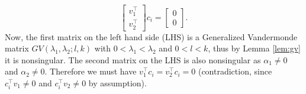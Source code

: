 \documentclass[twocolumn]{autart}    %
\begin{document}
{\begin{pf}
\begin{equation}
	\begin{bmatrix} v_1^\top \\ v_2^\top \end{bmatrix} c_i = \begin{bmatrix} 0 \\ 0 \end{bmatrix}. \nonumber 
\end{equation}
Now, the first matrix on the left hand side (LHS) is a Generalized Vandermonde matrix $GV(\lambda_1,\lambda_2;l, k)$ with $0<\lambda_1< \lambda_2$ and $0< l<k$, thus by Lemma \ref{lem:gv} it is nonsingular. The second matrix on the LHS is also nonsingular as $\alpha_1 \neq 0$ and $\alpha_2 \neq 0$. Therefore we must have $v_1^\top c_i = v_2^\top c_i = 0$ (contradiction, since $c_i^\top v_1 \neq 0$ and $c_i^\top v_2 \neq 0$ by assumption).


\end{pf}}
\end{document}

